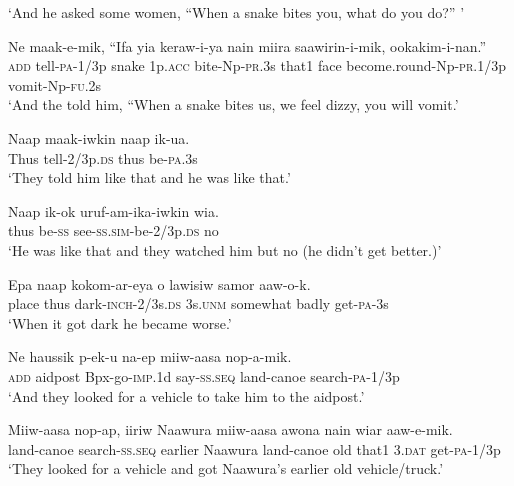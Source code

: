 \glt ‘And he asked some women, “When a snake bites you, what do you do?” ’ \\
\z


\ea
\gll  Ne  maak-e-mik,  “Ifa  yia  keraw-i-ya  nain      miira  saawirin-i-mik,  ookakim-i-nan.” \\
\textsc{add}  tell-\textsc{pa}-1/3p  snake  1p.\textsc{acc}  bite-Np-\textsc{pr}.3s  that1  face  become.round-Np-\textsc{pr}.1/3p  vomit-Np-\textsc{fu}.2s \\


\glt ‘And the told him, “When a snake bites us, we feel dizzy, you will vomit.’ \\
\z


\ea
\gll  Naap  maak-iwkin  naap  ik-ua. \\
Thus  tell-2/3p.\textsc{ds}  thus  be-\textsc{pa}.3s \\
\glt ‘They told him like that and he was like that.’ \\
\z


\ea
\gll  Naap  ik-ok  uruf-am-ika-iwkin  wia. \\
thus  be-\textsc{ss}  see-\textsc{ss}.\textsc{sim}-be-2/3p.\textsc{ds}  no \\
\glt ‘He was like that and they watched him but no (he didn’t get better.)’ \\
\z


\ea
\gll  Epa  naap  kokom-ar-eya  o  lawisiw  samor         aaw-o-k. \\
place  thus  dark-\textsc{inch}-2/3s.\textsc{ds}  3s.\textsc{unm}  somewhat  badly  get-\textsc{pa}-3s \\


\glt ‘When it got dark he became worse.’ \\
\z


\ea
\gll  Ne  haussik  p-ek-u  na-ep  miiw-aasa  nop-a-mik. \\
\textsc{add}  aidpost  Bpx-go-\textsc{imp}.1d  say-\textsc{ss.seq}  land-canoe  search-\textsc{pa}-1/3p \\
\glt ‘And they looked for a vehicle to take him to the aidpost.’ \\
\z


\ea
\gll  Miiw-aasa  nop-ap,  iiriw  Naawura  miiw-aasa  awona  nain     wiar  aaw-e-mik. \\
land-canoe  search-\textsc{ss.seq}  earlier  Naawura  land-canoe  old  that1  3.\textsc{dat}  get-\textsc{pa}-1/3p \\


\glt ‘They looked for a vehicle and got Naawura’s earlier old vehicle/truck.’ \\
\z


